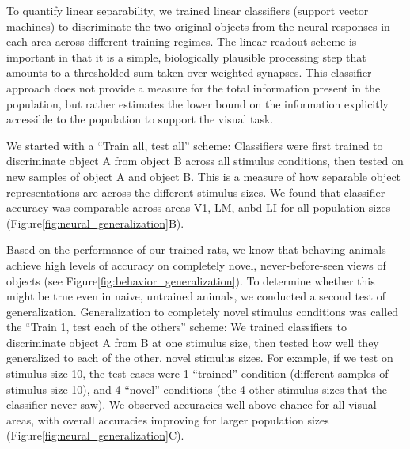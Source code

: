 To quantify linear separability, we trained linear classifiers (support vector machines) to discriminate the two original objects from the neural responses in each area across different training regimes. The linear-readout scheme is important in that it is a simple, biologically plausible processing step that amounts to a thresholded sum taken over weighted synapses\cite{REFREF}. This classifier approach does not provide a measure for the total information present in the population, but rather estimates the lower bound on the information explicitly accessible to the population to support the visual task. 

We started with a “Train all, test all” scheme:  Classifiers were first trained to discriminate object A from object B across all stimulus conditions, then tested on new samples of object A and object B. This is a measure of how separable object representations are across the different stimulus sizes. We found that classifier accuracy was comparable across areas V1, LM, anbd LI for all population sizes (Figure\ref{fig:neural_generalization}B). %


Based on the performance of our trained rats, we know that behaving animals achieve high levels of accuracy on completely novel, never-before-seen views of objects (see Figure\ref{fig:behavior_generalization}). To determine whether this might be true even in naive, untrained animals, we conducted a second test of generalization. Generalization to completely novel stimulus conditions was called the “Train 1, test each of the others” scheme:  We trained classifiers to discriminate object A from B at one stimulus size, then tested how well they generalized to each of the other, novel stimulus sizes. For example, if we test on stimulus size 10, the test cases were 1 “trained” condition (different samples of stimulus size 10), and 4 “novel” conditions (the 4 other stimulus sizes that the classifier never saw). We observed accuracies well above chance for all visual areas, with overall accuracies improving for larger population sizes (Figure\ref{fig:neural_generalization}C). 

